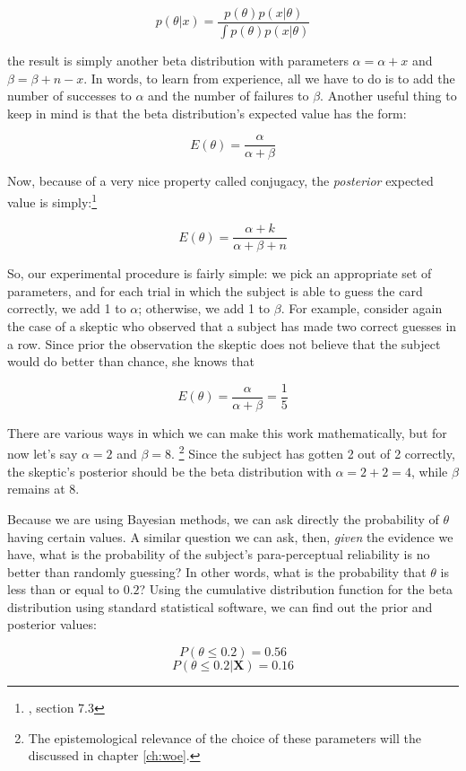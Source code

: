 \[ p(\theta|x) = \frac{p(\theta)p(x|\theta)}{\int p(\theta)p(x|\theta)}\]

\noindent the result is simply another beta distribution with parameters
\(\alpha =\alpha + x\) and \(\beta = \beta + n - x\). In words, to learn
from experience, all we have to do is to add the number of successes to
\(\alpha\) and the number of failures to \(\beta\). Another useful thing
to keep in mind is that the beta distribution's expected value has the
form:

\[E(\theta) = \frac{\alpha}{\alpha + \beta}\]

\noindent Now, because of a very nice property called conjugacy, the \emph{posterior} expected value
is simply:\footnote{\cite{degroot}, section 7.3}

\[E(\theta) = \frac{\alpha + k}{\alpha + \beta + n}\]

So, our experimental procedure is fairly simple: we pick an appropriate
set of parameters, and for each trial in which the subject is able to
guess the card correctly, we add 1 to \(\alpha\); otherwise, we add 1 to
\(\beta\). For example, consider again the case of a skeptic who
observed that a subject has made two correct guesses in a row. Since
prior the observation the skeptic does not believe that the subject
would do better than chance, she knows that

\[E(\theta) = \frac{\alpha}{\alpha + \beta} = \frac{1}{5}\]

There are various ways in which we can make this work mathematically,
but for now let's say \(\alpha = 2\) and \(\beta = 8\). \footnote{The epistemological relevance of the choice of these parameters will the discussed in chapter \ref{ch:woe}.} Since the
subject has gotten 2 out of 2 correctly, the skeptic's posterior should
be the beta distribution with \(\alpha= 2+2=4\), while \(\beta\) remains
at 8.

Because we are using Bayesian methods, we can ask directly the
probability of \(\theta\) having certain values. A similar question we
can ask, then, \emph{given} the evidence we have, what is the
probability of the subject's para-perceptual reliability is no better
than randomly guessing? In other words, what is the probability that
\(\theta\) is less than or equal to \(0.2\)? Using the cumulative
distribution function for the beta distribution using standard
statistical software, we can find out the prior and posterior values:

\[P(\theta \leq 0.2) = 0.56\] \[P(\theta \leq 0.2|\mathbf{X}) = 0.16\]

